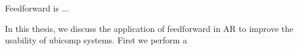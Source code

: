 \documentclass[a4paper,fancychapters]{article}
\begin{document}
Feedforward is ...

In this thesis, we discuss the application of feedforward in AR to improve the usability of ubicomp systems. First we perform a 



%
%
%
%
%	
%	
\end{document}
